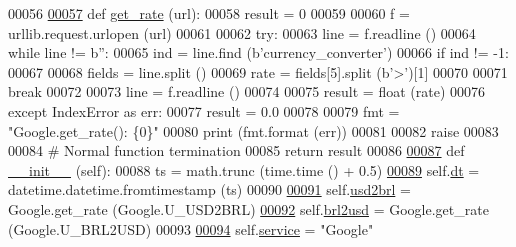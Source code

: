 \begin{DoxyCode}
{{00056 
\hyperlink{classrates_1_1_google_afa49252959b89741449dca773f2141b8}{00057}     \textcolor{keyword}{def }\hyperlink{classrates_1_1_google_afa49252959b89741449dca773f2141b8}{get\_rate} (url):
00058         result = 0
00059     
00060         f = urllib.request.urlopen (url)
00061         
00062         \textcolor{keywordflow}{try}:
00063             line = f.readline ()
00064             \textcolor{keywordflow}{while} line != b\textcolor{stringliteral}{''}:
00065                 ind = line.find (b\textcolor{stringliteral}{'currency\_converter'})
00066                 \textcolor{keywordflow}{if} ind != -1:
00067                     
00068                     fields = line.split ()
00069                     rate = fields[5].split (b\textcolor{stringliteral}{'>'})[1]
00070                     
00071                     \textcolor{keywordflow}{break}
00072                     
00073                 line = f.readline ()
00074             
00075             result = float (rate)
00076         \textcolor{keywordflow}{except} IndexError \textcolor{keyword}{as} err:
00077             result = 0.0
00078             
00079             fmt = \textcolor{stringliteral}{"Google.get\_rate(): \{0\}"}
00080             \textcolor{keywordflow}{print} (fmt.format (err))
00081             
00082             \textcolor{keywordflow}{raise}
00083         
00084         \textcolor{comment}{# Normal function termination}
00085         \textcolor{keywordflow}{return} result
00086 
\hyperlink{classrates_1_1_google_a6d9d023db3b4f6f2b585397e3469c396}{00087}     \textcolor{keyword}{def }\hyperlink{classrates_1_1_google_a6d9d023db3b4f6f2b585397e3469c396}{\_\_init\_\_} (self):
00088         ts = math.trunc (time.time () + 0.5)
\hyperlink{classrates_1_1_google_a76574be36237f78780f76bed53e69ab2}{00089}         self.\hyperlink{classrates_1_1_google_a76574be36237f78780f76bed53e69ab2}{dt} = datetime.datetime.fromtimestamp (ts)
00090                 
\hyperlink{classrates_1_1_google_a94c28f6d60d5d6afc075416d7378471c}{00091}         self.\hyperlink{classrates_1_1_google_a94c28f6d60d5d6afc075416d7378471c}{usd2brl} = Google.get\_rate (Google.U\_USD2BRL)
\hyperlink{classrates_1_1_google_a0979ffcb18b8bf3156cc5735c67ca6df}{00092}         self.\hyperlink{classrates_1_1_google_a0979ffcb18b8bf3156cc5735c67ca6df}{brl2usd} = Google.get\_rate (Google.U\_BRL2USD)
00093                 
\hyperlink{classrates_1_1_google_a1da08e36d5007aa5293d048b625a35e9}{00094}         self.\hyperlink{classrates_1_1_google_a1da08e36d5007aa5293d048b625a35e9}{service} = \textcolor{stringliteral}{"Google"}
}}
\end{DoxyCode}
